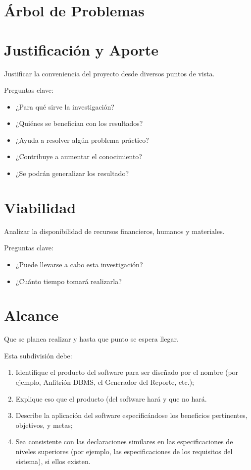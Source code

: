 \documentclass[12pt]{report}
\begin{document}
\section{Árbol de Problemas}
\lipsum[1]%

\section{Justificación y Aporte}
Justificar la conveniencia del proyecto desde diversos puntos de vista.

Preguntas clave:
  \begin{itemize}
  \item ¿Para qué sirve la investigación?
  \item ¿Quiénes se benefician con los resultados?
  \item ¿Ayuda a resolver algún problema práctico?
  \item ¿Contribuye a aumentar el conocimiento?
  \item ¿Se podrán generalizar los resultado?
\end{itemize}


\begin{ejemplo}
\lipsum[1]%
\end{ejemplo}


\section{Viabilidad}
Analizar la disponibilidad de recursos financieros, humanos y materiales.

Preguntas clave:
  \begin{itemize}\justifying
  \item ¿Puede llevarse a cabo esta investigación?
  \item ¿Cuánto tiempo tomará realizarla?
\end{itemize}


\section{Alcance}
Que se planea realizar y hasta que punto se espera llegar.

Esta subdivisión debe:
\begin{enumerate}\justifying
  \item Identifique el producto del software para ser diseñado por el nombre (por ejemplo, Anfitrión DBMS, el Generador del Reporte, etc.);
  \item Explique eso que el producto (del software hará y que no hará.
  \item Describe la aplicación del software especificándose los beneficios pertinentes, objetivos, y metas;
  \item Sea consistente con las declaraciones similares en las especificaciones de niveles superiores (por ejemplo, las especificaciones de los requisitos del sistema), si ellos existen.
\end{enumerate}
\end{document}
